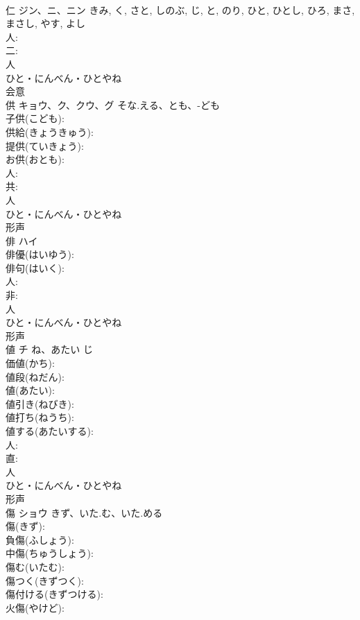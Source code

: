 \documentclass[8pt]{extreport}
\begin{document}
\begin{CJK}{UTF8}{min}
\\	仁	ジン、ニ、ニン		きみ, く, さと, しのぶ, じ, と, のり, ひと, ひとし, ひろ, まさ, まさし, やす, よし	
\\	人: 
\\	二: 
\\	人	
\\	ひと・にんべん・ひとやね	
\\	会意 
\\	供	キョウ、ク、クウ、グ	そな.える、とも、-ども		
\\	子供(こども): 
\\	供給(きょうきゅう): 
\\	提供(ていきょう): 
\\	お供(おとも): 
\\	人: 
\\	共: 
\\	人	
\\	ひと・にんべん・ひとやね	
\\	形声 
\\	俳	ハイ			
\\	俳優(はいゆう): 
\\	俳句(はいく): 
\\	人: 
\\	非: 
\\	人	
\\	ひと・にんべん・ひとやね	
\\	形声 
\\	値	チ	ね、あたい	じ	
\\	価値(かち): 
\\	値段(ねだん): 
\\	値(あたい): 
\\	値引き(ねびき): 
\\	値打ち(ねうち): 
\\	値する(あたいする): 
\\	人: 
\\	直: 
\\	人	
\\	ひと・にんべん・ひとやね	
\\	形声 
\\	傷	ショウ	きず、いた.む、いた.める		
\\	傷(きず): 
\\	負傷(ふしょう): 
\\	中傷(ちゅうしょう): 
\\	傷む(いたむ): 
\\	傷つく(きずつく): 
\\	傷付ける(きずつける): 
\\	火傷(やけど): 

\end{CJK}
\end{document}
